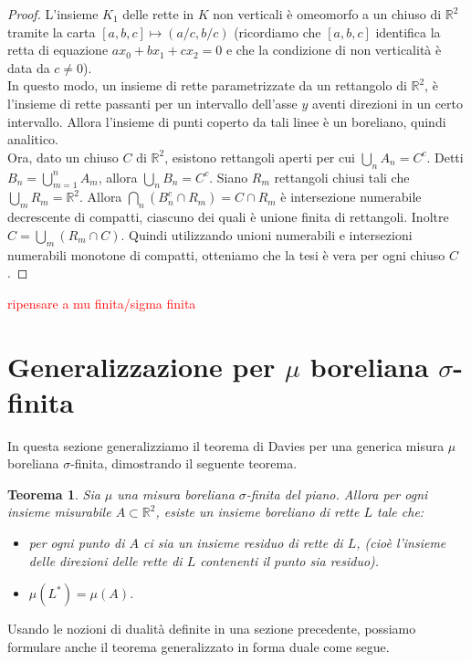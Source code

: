 \documentclass[a4paper, twoside,openright]{article}
\newcommand{\R}{\mathbb{R}}
\newcommand{\<}{\langle}
\renewcommand{\>}{\rangle}
\newtheorem{teo}{Teorema}[]
\begin{document}
\begin{proof}
L'insieme $K_1$ delle rette in $K$ non verticali è omeomorfo a un chiuso di $\R^2$ tramite la carta $[a,b,c] \mapsto (a/c,b/c)$ (ricordiamo che $[a,b,c]$ identifica la retta di equazione $ax_0+bx_1+cx_2=0$ e che la condizione di non verticalità è data da $c \neq 0$).\\
In questo modo, un insieme di rette parametrizzate da un rettangolo di $\R^2$, è l'insieme di rette passanti per un intervallo dell'asse $y$ aventi direzioni in un certo intervallo. Allora l'insieme di punti coperto da tali linee è un boreliano, quindi analitico.\\
Ora, dato un chiuso $C$ di $\R^2$, esistono rettangoli aperti per cui $\bigcup_n A_n = C^c$. Detti $B_n = \bigcup_{m=1}^n A_m$, allora $\bigcup_n B_n = C^c$. Siano $R_m$ rettangoli chiusi tali che $\bigcup_m R_m = \R^2$. Allora $\bigcap_n(B_n^c \cap R_m)=C \cap R_m$ è intersezione numerabile decrescente di compatti, ciascuno dei quali è unione finita di rettangoli. Inoltre $C=\bigcup_m(R_m \cap C)$. Quindi utilizzando unioni numerabili e intersezioni numerabili monotone di compatti, otteniamo che la tesi è vera per ogni chiuso $C$.
\end{proof}
\textcolor{red}{ripensare a mu finita/sigma finita}
\newpage


\section{Generalizzazione per $\mu$ boreliana $\sigma$-finita}

In questa sezione generalizziamo il teorema di Davies per una generica misura $\mu$ boreliana $\sigma$-finita, dimostrando il seguente teorema.


\begin{teo}
	Sia $\mu$ una misura boreliana $\sigma$-finita del piano. Allora per ogni insieme misurabile $A \subset \mathbb{R}^{2}$, esiste un insieme boreliano di rette $L$ tale che:
	\begin{itemize}
		\item per ogni punto di $A$ ci sia un insieme residuo di rette di $L$, (cioè l'insieme delle direzioni delle rette di $L$ contenenti il punto sia residuo).
		\item $\mu\left(L^{*}\right)=\mu(A)$.
	\end{itemize}
\end{teo}

Usando le nozioni di dualità definite in una sezione precedente, possiamo formulare anche il teorema generalizzato in forma duale come segue.
\end{document}
